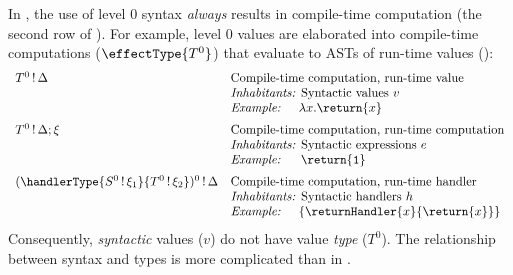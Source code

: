 In \sourceLang{}, the use of level $0$ syntax \textit{always} results in compile-time computation (the second row of ). For example, level $0$ values are elaborated into compile-time computations ($\effectType{T^0}$) that evaluate to ASTs of run-time values ():
\[\begin{array}{ll}
  T^0 \, ! \, \Delta  & \text{Compile-time computation, run-time value} \\
  & \textit{Inhabitants: }\text{Syntactic values $v$} \\
  &\textit{Example: } \quad \lambda x. \return{x} \\[2mm]
  T^0 \, ! \, \Delta; \xi & \text{Compile-time computation, run-time computation} \\
   & \textit{Inhabitants: } \text{Syntactic expressions $e$} \\
  &\textit{Example: } \quad \, \return{\texttt{1}} \\[2mm]
  (\handlerType{S^0 \, ! \, \xi_1}{T^0 \, ! \, \xi_2})^0\, !\, \Delta & \text{Compile-time computation, run-time handler} \\
   & \textit{Inhabitants: }\text{Syntactic handlers $h$} \\
  &\textit{Example: } \quad \{ \returnHandler{x}{\return{x}} \}
\end{array}
\]
Consequently, \textit{syntactic} values ($v$) do not have value \textit{type} ($T^0$). The relationship between syntax and types is more complicated than in \efflang{}. 

